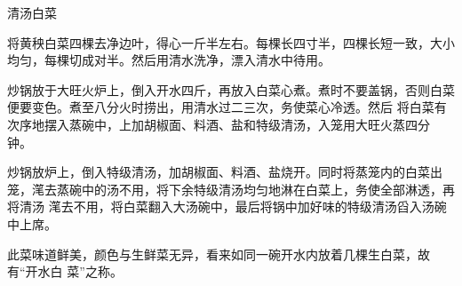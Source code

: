 %
%
%
%
%
%
%
\begin{recipe}[开水白菜]{清汤白菜}

\ingredients


\preparation

\step 将黄秧白菜四棵去净边叶，得心一斤半左右。每棵长四寸半，四棵长短一致，大小
均匀，每棵切成对半。然后用清水洗净，漂入清水中待用。

\step 炒锅放于大旺火炉上，倒入开水四斤，再放入白菜心煮。煮时不要盖锅，否则白菜
便要变色。煮至八分火\footnotemark 时捞出，用清水过二三次，务使菜心冷透。然后
将白菜有次序地摆入蒸碗中，上加胡椒面、料酒、盐和特级清汤，入笼用大旺火蒸四分
钟。

\step 炒锅放炉上，倒入特级清汤，加胡椒面、料酒、盐烧开。同时将蒸笼内的白菜出
笼，滗去蒸碗中的汤不用，将下余特级清汤均匀地淋在白菜上，务使全部淋透，再将清汤
滗去不用，将白菜翻入大汤碗中，最后将锅中加好味的特级清汤舀入汤碗中上席。

\features

此菜味道鲜美，颜色与生鲜菜无异，看来如同一碗开水内放着几棵生白菜，故有“开水白
菜”之称。


\end{recipe}

